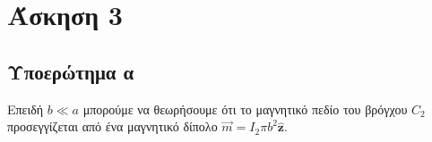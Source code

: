 \section{Άσκηση 3}

\subsection{Υποερώτημα α}

Επειδή $b \ll a$ μπορούμε να θεωρήσουμε ότι το μαγνητικό πεδίο του βρόγχου
$C_2$ προσεγγίζεται από ένα μαγνητικό δίπολο $\vec{m} = I_2\pi b^2
\hat{\mathbf{z}}$.

% 
% 
% 
% 
% 
% 
% 
% 
